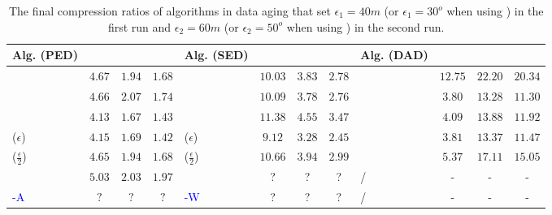 {   	 	
\begin{table}
	\caption{\small The final compression ratios of algorithms in data aging that set $\epsilon_1=40m$ (or $\epsilon_1=30^o$ when using \dad) in the first run and $\epsilon_2=60m$ (or $\epsilon_2=50^o$ when using \dad) in the second run.}
	\centering
	\scriptsize
	\vspace{-1ex}
	\begin{tabular}{|l|c|c|c|l|c|c|c|l|c|c|c|}
		\hline
		\bf{Alg. (PED)}  &\ucar &\geolife &\mopsi & \bf{Alg. (SED)}  &\ucar &\geolife &\mopsi &\bf{Alg. (DAD)}  &\ucar &\geolife &\mopsi \\
		\hline  		
		{\dpa} &	$4.67$ & $1.94 $ &	$1.68$	&\dpa &$10.03$ &$3.83$ & $2.78 $ & \dpa	& $12.75$	& $22.20$	& $20.34 $ \\
		\hline
		{\tpa} &	$4.66$ & $	2.07 $ &	$1.74 $	&\tpa 	& $10.09$& $3.78$ &$2.76$ & \tpa	& $3.80$	& $13.28$	& $11.30$ \\
		\hline
		{\bqsa} &	$4.13$ & $1.67 $ &	$ 1.43 $	&\squishe &$11.38$ &$4.55$ & $3.47$ & \opwa	& $4.09$	& $13.88$	& $11.92$ \\
		\hline
		{\siped($\epsilon$)} &	$4.15 $ & $1.69 $ &	$1.42$	&\cised($\epsilon$) & $9.12$ &$3.28$ &$2.45 $ & \interval	& $3.81$	& $13.37$	& $11.47 $ \\
		\hline
		{\siped($\frac{\epsilon}{2}$)} &	$4.65 $ & $1.94$ &	$1.68$ &\cised($\frac{\epsilon}{2}$) &$10.66 $ & $3.94$ & $2.99 $& \intersec	& $5.37$	& $17.11$	& $15.05 $ \\
		\hline
		{\operb} &	$5.03$ & $2.03 $ &	$ 1.97 $	& \textcolor{blue}{\dagots} &? &? &? & / &- &- & - \\
		\hline
		\textcolor{blue}{\operb-A} &	${?} $ & ${?} $ & ${?} $	& \textcolor{blue}{\cised-W} &? &? &? & / &- &- &- \\
		\hline
	\end{tabular}
	\label{tab:aging-cr}	
	\vspace{-2ex}
\end{table}

 	 	
   	 	
}
